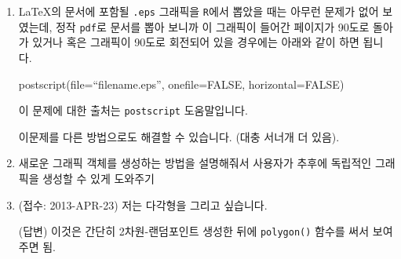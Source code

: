 \begin{enumerate}
\item \LaTeX 의 문서에 포함될 \texttt{.eps} 그래픽을 \texttt{R}에서 뽑았을 때는 아무런 문제가 없어 보였는데, 정작 \texttt{pdf}로 문서를 뽑아 보니까 이 그래픽이 들어간 페이지가 90도로 돌아가 있거나 혹은 그래픽이 90도로 회전되어 있을 경우에는 아래와 같이 하면 됩니다.

\begin{Schunk}
 \begin{Sinput}
  postscript(file=``filename.eps'', onefile=FALSE, horizontal=FALSE)
 \end{Sinput}
\end{Schunk}

이 문제에 대한 출처는 \texttt{postscript} 도움말입니다.

이문제를 다른 방법으로도 해결할 수 있습니다.  (대충 서너개 더 있음).

\item 새로운 그래픽 객체를 생성하는 방법을 설명해줘서 사용자가 추후에 독립적인 그래픽을 생성할 수 있게 도와주기 

	\item (접수: 2013-APR-23)  저는 다각형을 그리고 싶습니다. 
	
	\textsf{(답변)}  이것은 간단히 2차원-랜덤포인트 생성한 뒤에 \texttt{polygon()} 함수를 써서 보여주면 됨. 

\end{enumerate}












